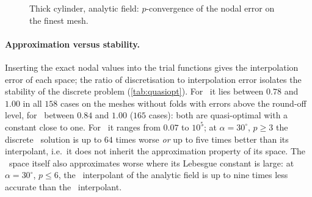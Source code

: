 \begin{figure}[t]
  \centering
  \caption{Thick cylinder, analytic field: $p$-convergence of the nodal error on the finest
    mesh.}
  \label{fig:cyl-p}
\end{figure}

\paragraph{Approximation versus stability.} Inserting the exact nodal values into the trial
functions gives the interpolation error of each space; the ratio of discretisation to
interpolation error isolates the stability of the discrete problem (\cref{tab:quasiopt}). For \PH\ it
lies between $0.78$ and $1.00$ in all $158$ cases on the meshes without folds with errors above the
round-off level, for \PP\ between $0.84$ and $1.00$ ($165$ cases): both are quasi-optimal with a
constant close to one. For \PM\ it ranges from $0.07$ to $10^5$; at $\alpha=30^\circ$, $p\ge3$ the
discrete \PM\ solution is up to $64$ times worse \emph{or} up to five times better than its
interpolant, i.e.\ it does not inherit the approximation property of its space. The \PM\ space
itself also approximates worse where its Lebesgue constant is large: at $\alpha=30^\circ$, $p\le6$, the
\PM\ interpolant of the analytic field is up to nine times less accurate than the \PH\
interpolant.

